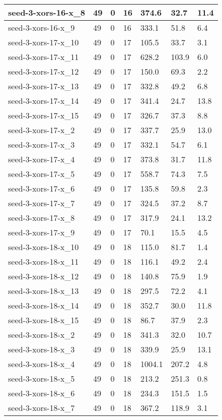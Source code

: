 \begin{scriptsize}
\begin{longtable}{|p{5cm}|l|l|l|l|l|l|}
seed-3-xors-16-x\_8&49&0&16&374.6&32.7&11.4 \\ \hline 
seed-3-xors-16-x\_9&49&0&16&333.1&51.8&6.4 \\ \hline 
seed-3-xors-17-x\_10&49&0&17&105.5&33.7&3.1 \\ \hline 
seed-3-xors-17-x\_11&49&0&17&628.2&103.9&6.0 \\ \hline 
seed-3-xors-17-x\_12&49&0&17&150.0&69.3&2.2 \\ \hline 
seed-3-xors-17-x\_13&49&0&17&332.8&49.2&6.8 \\ \hline 
seed-3-xors-17-x\_14&49&0&17&341.4&24.7&13.8 \\ \hline 
seed-3-xors-17-x\_15&49&0&17&326.7&37.3&8.8 \\ \hline 
seed-3-xors-17-x\_2&49&0&17&337.7&25.9&13.0 \\ \hline 
seed-3-xors-17-x\_3&49&0&17&332.1&54.7&6.1 \\ \hline 
seed-3-xors-17-x\_4&49&0&17&373.8&31.7&11.8 \\ \hline 
seed-3-xors-17-x\_5&49&0&17&558.7&74.3&7.5 \\ \hline 
seed-3-xors-17-x\_6&49&0&17&135.8&59.8&2.3 \\ \hline 
seed-3-xors-17-x\_7&49&0&17&324.5&37.2&8.7 \\ \hline 
seed-3-xors-17-x\_8&49&0&17&317.9&24.1&13.2 \\ \hline 
seed-3-xors-17-x\_9&49&0&17&70.1&15.5&4.5 \\ \hline 
seed-3-xors-18-x\_10&49&0&18&115.0&81.7&1.4 \\ \hline 
seed-3-xors-18-x\_11&49&0&18&116.1&49.2&2.4 \\ \hline 
seed-3-xors-18-x\_12&49&0&18&140.8&75.9&1.9 \\ \hline 
seed-3-xors-18-x\_13&49&0&18&297.5&72.2&4.1 \\ \hline 
seed-3-xors-18-x\_14&49&0&18&352.7&30.0&11.8 \\ \hline 
seed-3-xors-18-x\_15&49&0&18&86.7&37.9&2.3 \\ \hline 
seed-3-xors-18-x\_2&49&0&18&341.3&32.0&10.7 \\ \hline 
seed-3-xors-18-x\_3&49&0&18&339.9&25.9&13.1 \\ \hline 
seed-3-xors-18-x\_4&49&0&18&1004.1&207.2&4.8 \\ \hline 
seed-3-xors-18-x\_5&49&0&18&213.2&251.3&0.8 \\ \hline 
seed-3-xors-18-x\_6&49&0&18&234.3&151.5&1.5 \\ \hline 
seed-3-xors-18-x\_7&49&0&18&367.2&118.9&3.1 \\ \hline 

\end{longtable}
\end{scriptsize}
